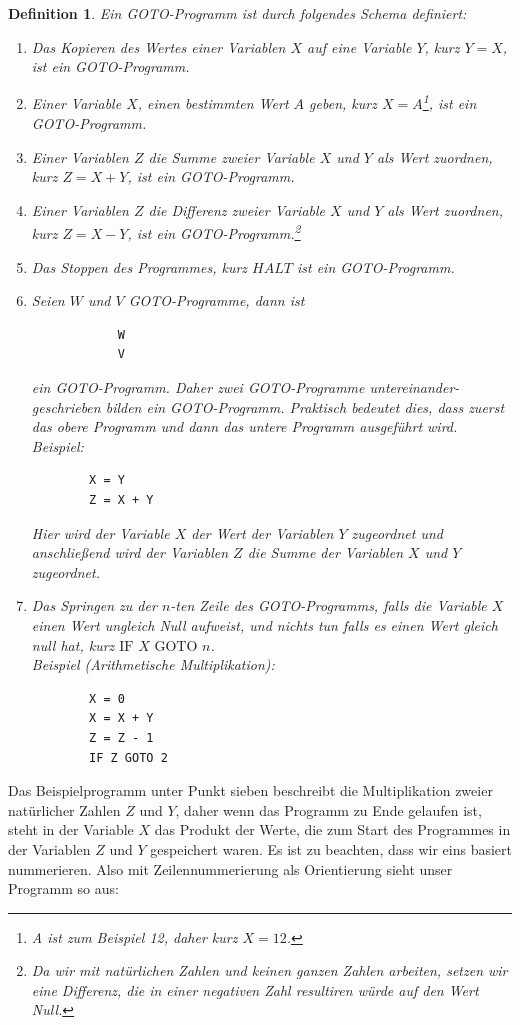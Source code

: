 \documentclass[11pt,a4paper,leqno]{report}
\newtheorem{definition}[theorem]{Definition}
\numberwithin{equation}{chapter}
\begin{document}
\begin{definition}
	Ein GOTO-Programm ist durch folgendes Schema definiert:
	\begin{enumerate}
		\item Das Kopieren des Wertes einer Variablen $X$ auf eine Variable $Y$, kurz $Y = X$, ist ein GOTO-Programm.
		\item Einer Variable $X$, einen bestimmten Wert $A$ geben, kurz $X = A$\footnote{A ist zum Beispiel 12, daher kurz $X = 12$.}, ist ein GOTO-Programm.
		\item Einer Variablen $Z$ die Summe zweier Variable $X$ und $Y$ als Wert zuordnen, kurz $Z = X + Y$, ist ein GOTO-Programm.
		\item Einer Variablen $Z$ die Differenz zweier Variable $X$ und $Y$ als Wert zuordnen, kurz $Z = X - Y$, ist ein GOTO-Programm.\footnote{Da wir mit nat\"urlichen Zahlen und keinen ganzen Zahlen arbeiten, setzen wir eine Differenz, die in einer negativen Zahl resultiren w\"urde auf den Wert Null.}
		\item Das Stoppen des Programmes, kurz $HALT$ ist ein GOTO-Programm.
		\item Seien $W$ und $V$ GOTO-Programme, dann ist
		\begin{lstlisting}
			W
			V
		\end{lstlisting}
		ein GOTO-Programm. Daher zwei GOTO-Programme untereinander- geschrieben bilden ein GOTO-Programm. Praktisch bedeutet dies, dass zuerst das obere Programm und dann das untere Programm ausgef\"uhrt wird. Beispiel:
		\begin{lstlisting}
		X = Y
		Z = X + Y
		\end{lstlisting}
		Hier wird der Variable $X$ der Wert der Variablen $Y$ zugeordnet und anschlie\ss{}end wird der Variablen $Z$ die Summe der Variablen $X$ und $Y$ zugeordnet.
		\item Das Springen zu der $n$-ten Zeile des GOTO-Programms, falls die Variable $X$ einen Wert ungleich Null aufweist, und nichts tun falls es einen Wert gleich null hat, kurz $\text{IF }X\text{ GOTO }n$.\\
		Beispiel (Arithmetische Multiplikation): 
		\begin{lstlisting}
		X = 0
		X = X + Y
		Z = Z - 1
		IF Z GOTO 2
		\end{lstlisting}
	\end{enumerate}
\end{definition}	
\noindent
Das Beispielprogramm unter Punkt sieben beschreibt die Multiplikation zweier nat\"urlicher Zahlen $Z$ und $Y$, daher wenn das Programm zu Ende gelaufen ist, steht in der Variable $X$ das Produkt der Werte, die zum Start des Programmes in der Variablen $Z$ und $Y$ gespeichert waren. Es ist zu beachten, dass wir eins basiert nummerieren. Also mit Zeilennummerierung als Orientierung sieht unser Programm so aus:
\end{document}
